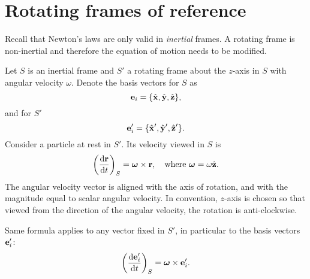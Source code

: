 \section{Rotating frames of reference}
Recall that Newton's laws are only valid in \textit{inertial} frames. A rotating frame is non-inertial and therefore the equation of motion needs to be modified.

Let $S$ is an inertial frame and $S'$ a rotating frame about the $z$-axis in $S$ with angular velocity $ \omega $. Denote the basis vectors for $S$ as 
\[
    {\bf e}_i = \{\hat{{\bf x}},\hat{{\bf y}},\hat{{\bf z}}\},
\]
and for $S'$ 
\[
    {\bf e}_i' = \{\hat{{\bf x}}',\hat{{\bf y}}',\hat{{\bf z}}'\}.
\]
Consider a particle at rest in $S'$. Its velocity viewed in $S$ is 
\[
    \left( \frac{\mathrm{d}{\bf r}}{\mathrm{d}t}  \right)_S = \boldsymbol{\omega} \times \mathbf{r},\quad \text{where $ \boldsymbol{\omega}=\omega \hat{{\bf z}} $}.
\]
The angular velocity vector is aligned with the axis of rotation, and with the magnitude equal to scalar angular velocity. In convention, $z$-axis is chosen so that viewed from the direction of the angular velocity, the rotation is anti-clockwise.

Same formula applies to any vector fixed in $S'$, in particular to the basis vectors $ {\bf e}_i' $:
\[
    \left( \frac{\mathrm{d}{\bf e}_i'}{\mathrm{d}t}  \right)_S = \boldsymbol{\omega}\times {\bf e}_i'.
\]

